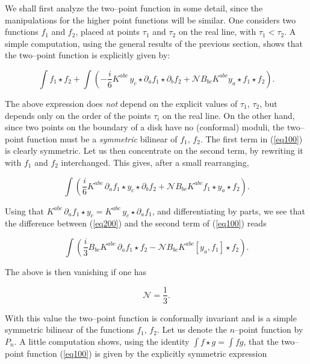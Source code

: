 \documentclass[a4paper,11pt]{article}
\begin{document}
We shall first analyze the two--point function in some detail, since the 
manipulations for the higher point functions will be  similar. One 
considers two functions $f_{1}$ and $f_{2}$, placed at points $\tau _{1}$ and 
$\tau _{2}$ on the real line, with $\tau _{1}<\tau _{2}$. A simple computation, 
using the general results of the previous section, shows that the two--point 
function is explicitly given by:

\begin{equation}
\int f_{1}\star f_{2}+\int \left( -\frac{i}{6}K^{abc}{}\,y_{c}\star \partial
_{a}f_{1}\star \partial _{b}f_{2}+\mathcal{N}B_{bc}K^{abc}y_{a}\star
f_{1}\star f_{2}\right) .  \label{eq100}
\end{equation}

\noindent
The above expression does \textit{not} depend on the explicit values of 
$\tau_{1}$, $\tau_{2}$, but depends only on the order of the points 
$\tau _{i}$ on the real line. On the other hand, since two points on the 
boundary of a disk have no (conformal) moduli, the two--point function must 
be a \textit{symmetric} bilinear of $f_{1}$, $f_{2}$. The first term in 
(\ref{eq100}) is clearly symmetric. Let us then concentrate on the second 
term, by rewriting it with $f_{1}$ and $f_{2}$ interchanged. This gives, 
after a small rearranging,

\begin{equation}
\int \left( \frac{i}{6}K^{abc}{}\,\partial _{a}f_{1}\star y_{c}\star
\partial _{b}f_{2}+\mathcal{N}B_{bc}K^{abc}f_{1}\star y_{a}\star
f_{2}\right) .  \label{eq200}
\end{equation}

\noindent
Using that $K^{abc}{}\,\partial _{a}f_{1}\star y_{c}=K^{abc}{}\,y_{c}\star
\partial _{a}f_{1}$, and differentiating by parts, we see that the
difference between (\ref{eq200}) and the second term of (\ref{eq100}) 
reads 

$$
\int \left( \frac{i}{3}B_{bc}K^{abc}{}\,\partial _{a}f_{1}\star f_{2} 
- \mathcal{N}B_{bc}K^{abc}\left[ y_{a},f_{1}\right] \star f_{2}\right) .
$$

\noindent
The above is then vanishing if one has

$$
\mathcal{N}=\frac{1}{3}.
$$

\noindent
With this value the two--point function is conformally invariant and is a
simple symmetric bilinear of the functions $f_{1}$, $f_{2}$. Let us denote 
the $n$--point function by $P_{n}$. A little computation shows, using the
identity $\int f\star g=\int fg$, that the two--point function (\ref{eq100})
is given by the explicitly symmetric expression 
\end{document}
